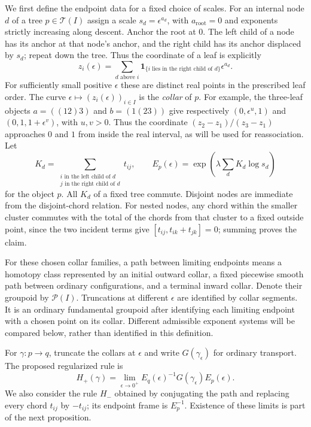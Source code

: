 We first define the endpoint data for a fixed choice of scales.
For an internal node $d$ of a tree $p\in\mathcal T(I)$ assign a scale
$s_d=\epsilon^{a_d}$, with $a_{\mathrm{root}}=0$ and exponents strictly
increasing along descent.  Anchor the root at $0$.  The left child of a
node has its anchor at that node's anchor, and the right child has its
anchor displaced by $s_d$; repeat down the tree.  Thus the coordinate
of a leaf is explicitly
\begin{equation}\label{eq:holonomy-tree-coordinate}
 z_i(\epsilon)=
 \sum_{d\text{ above }i}
 \mathbf1_{\{i\text{ lies in the right child of }d\}}\epsilon^{a_d}.
\end{equation}
For sufficiently small positive $\epsilon$ these are distinct real
points in the prescribed leaf order.  The curve
$\epsilon\mapsto(z_i(\epsilon))_{i\in I}$ is the \emph{collar} of $p$.
For example, the three-leaf
objects $a=((12)3)$ and $b=(1(23))$ give respectively
$(0,\epsilon^u,1)$ and $(0,1,1+\epsilon^v)$, with $u,v>0$.
Thus the coordinate $(z_2-z_1)/(z_3-z_1)$ approaches $0$ and $1$
from inside the real interval, as will be used for reassociation.
Let
\[
 K_d=\sum_{\substack{i\text{ in the left child of }d\\
              j\text{ in the right child of }d}}t_{ij},
 \qquad
 E_p(\epsilon)=
 \exp\left(\lambda\sum_dK_d\log s_d\right)
\]
for the object $p$.  All $K_d$ of a fixed tree commute.  Disjoint nodes
are immediate from the disjoint-chord relation.  For nested nodes,
any chord within the smaller cluster commutes with the total of the
chords from that cluster to a fixed outside point, since the two
incident terms give $[t_{ij},t_{ik}+t_{jk}]=0$; summing proves the
claim.

For these chosen collar families, a path between limiting endpoints
means a homotopy class represented by an initial outward collar, a
fixed piecewise smooth path between ordinary configurations, and a
terminal inward collar.  Denote their groupoid by $\mathcal P(I)$.
Truncations at different $\epsilon$ are identified by collar segments.
It is an ordinary fundamental groupoid after identifying each limiting
endpoint with a chosen point on its collar.  Different admissible
exponent systems will be compared below, rather than identified in
this definition.

For $\gamma:p\longrightarrow q$, truncate the collars at $\epsilon$
and write $G(\gamma_\epsilon)$ for ordinary transport.  The proposed
regularized rule is
\begin{equation}\label{eq:holonomy-regularized}
 H_+(\gamma)=\lim_{\epsilon\to0^+}
 E_q(\epsilon)^{-1}G(\gamma_\epsilon)E_p(\epsilon).
\end{equation}
We also consider the rule $H_-$ obtained by conjugating the path and
replacing every chord $t_{ij}$ by $-t_{ij}$; its endpoint frame is
$E_p^{-1}$.  Existence of these limits is part of the next proposition.

